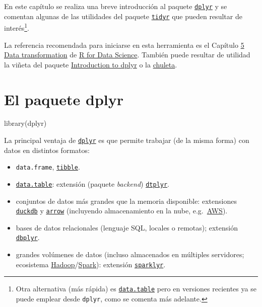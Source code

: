 \documentclass[
]{book}
\newenvironment{Shaded}{\begin{snugshade}}{\end{snugshade}}
\newcommand{\FunctionTok}[1]{\textcolor[rgb]{0.00,0.00,0.00}{#1}}
\newcommand{\NormalTok}[1]{#1}
\theoremstyle{break}
\theoremstyle{nonumberplain}
\begin{document}
En este capítulo se realiza una breve introducción al paquete \href{https://dplyr.tidyverse.org}{\texttt{dplyr}} y se comentan algunas de las utilidades del paquete \href{https://tidyr.tidyverse.org}{\texttt{tidyr}} que pueden resultar de interés\footnote{Otra alternativa (más rápida) es \href{https://rdatatable.gitlab.io/data.table}{\texttt{data.table}} pero en versiones recientes ya se puede emplear desde \texttt{dplyr}, como se comenta más adelante.}.

La referencia recomendada para iniciarse en esta herramienta es el Capítulo \href{http://r4ds.had.co.nz/transform.html}{5 Data transformation} de
\href{http://r4ds.had.co.nz}{R for Data Science}.
También puede resultar de utilidad la viñeta del paquete \href{https://dplyr.tidyverse.org/articles/dplyr.html}{Introduction to dplyr} o la \href{https://posit.co/wp-content/uploads/2022/10/data-transformation-1.pdf}{chuleta}.

\hypertarget{dplyr-pkg}{%
\section{El paquete dplyr}\label{dplyr-pkg}}

\begin{Shaded}
\begin{Highlighting}[]
\FunctionTok{library}\NormalTok{(dplyr)}
\end{Highlighting}
\end{Shaded}

La principal ventaja de \href{https://dplyr.tidyverse.org/index.html}{\texttt{dplyr}} es que permite trabajar (de la misma forma) con datos en distintos formatos:

\begin{itemize}
\item
  \texttt{data.frame}, \href{https://tibble.tidyverse.org/}{\texttt{tibble}}.
\item
  \href{https://rdatatable.gitlab.io/data.table}{\texttt{data.table}}: extensión (paquete \emph{backend}) \href{https://dtplyr.tidyverse.org}{\texttt{dtplyr}}.
\item
  conjuntos de datos más grandes que la memoria disponible: extensiones \href{https://duckdb.org/docs/api/r}{\texttt{duckdb}} y \href{https://arrow.apache.org/docs/r/}{\texttt{arrow}} (incluyendo almacenamiento en la nube, e.g.~\href{https://aws.amazon.com/es/s3}{AWS}).
\item
  bases de datos relacionales (lenguaje SQL, locales o remotas); extensión \href{https://dbplyr.tidyverse.org}{\texttt{dbplyr}}.
\item
  grandes volúmenes de datos (incluso almacenados en múltiples servidores; ecosistema \href{http://hadoop.apache.org/}{Hadoop}/\href{https://spark.apache.org/}{Spark}): extensión \href{https://spark.rstudio.com}{\texttt{sparklyr}}.
\end{itemize}
\end{document}
